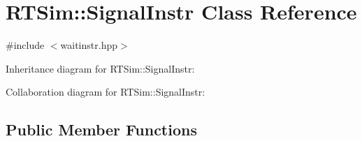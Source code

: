 \hypertarget{classRTSim_1_1SignalInstr}{}\section{R\+T\+Sim\+:\+:Signal\+Instr Class Reference}
\label{classRTSim_1_1SignalInstr}


{\ttfamily \#include $<$waitinstr.\+hpp$>$}



Inheritance diagram for R\+T\+Sim\+:\+:Signal\+Instr\+:


Collaboration diagram for R\+T\+Sim\+:\+:Signal\+Instr\+:
\subsection*{Public Member Functions}

